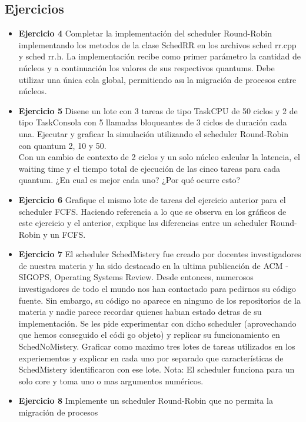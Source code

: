 
\subsection{Ejercicios}
\begin{itemize}
 \item 
\textbf{Ejercicio 4}  Completar la implementación del scheduler Round-Robin implementando los
metodos de la clase SchedRR en los archivos sched rr.cpp y sched rr.h. La implementaci\'{o}n
recibe como primer par\'{a}metro la cantidad de n\'{u}cleos y a continuaci\'{o}n los valores de sus
respectivos quantums. Debe utilizar una \'{u}nica cola global, permitiendo ası la migraci\'{o}n de
procesos entre n\'{u}cleos.
\item \textbf{Ejercicio 5} Disene un lote con 3 tareas de tipo TaskCPU de 50 ciclos y 2 de tipo TaskConsola
con 5 llamadas bloqueantes de 3 ciclos de duraci\'{o}n cada una. Ejecutar y graficar la simulaci\'{o}n
utilizando el scheduler Round-Robin con quantum 2, 10 y 50.\\
Con un cambio de contexto de 2 ciclos y un solo n\'{u}cleo calcular la latencia, el waiting
time y el tiempo total de ejecuci\'{o}n de las cinco tareas para cada quantum. 
¿En cual es mejor cada uno? ¿Por qu\'{e} ocurre esto?
\item \textbf{Ejercicio 6} Grafique el mismo lote de tareas del ejercicio anterior para el scheduler FCFS.
Haciendo referencia a lo que se observa en los gr\'{a}ficos de este ejercicio y el anterior, explique
las diferencias entre un scheduler Round-Robin y un FCFS.
\item \textbf{Ejercicio 7} El scheduler SchedMistery fue creado por docentes investigadores de nuestra
materia y ha sido destacado en la ultima publicaci\'{o}n de ACM - SIGOPS, Operating Systems
Review. Desde entonces, numerosos investigadores de todo el mundo nos han contactado para
pedirnos su c\'{o}digo fuente. Sin embargo, su c\'{o}digo no aparece en ninguno de los repositorios
de la materia y nadie parece recordar quienes habıan estado detras de su implementaci\'{o}n.
Se les pide experimentar con dicho scheduler (aprovechando que hemos conseguido el c\'{o}di
go objeto) y replicar su funcionamiento en SchedNoMistery. Graficar como maximo tres lotes
de tareas utilizados en los experiementos y explicar en cada uno por separado que caracter\'{i}sticas
de SchedMistery identificaron con ese lote. Nota: El scheduler funciona para un solo
core y toma uno o mas argumentos num\'{e}ricos.
\item \textbf{Ejercicio 8} Implemente un scheduler Round-Robin que no permita la migraci\'{o}n de procesos

\end{itemize}

